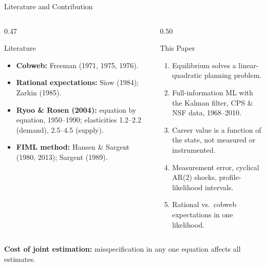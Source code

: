 \documentclass[10pt]{beamer}
\begin{document}
\begin{frame}{Literature and Contribution}
  \begin{columns}[T]
    \begin{column}{0.47\textwidth}
      \begin{block}{Literature}
        \small
        \begin{itemize}
          \item \textbf{Cobweb:} Freeman (1971, 1975, 1976).
          \item \textbf{Rational expectations:} Siow (1984); Zarkin (1985).
          \item \textbf{Ryoo \& Rosen (2004):} equation by equation, 1950--1990; elasticities 1.2--2.2 (demand), 2.5--4.5 (supply).
          \item \textbf{FIML method:} Hansen \& Sargent (1980, 2013); Sargent (1989).
        \end{itemize}
      \end{block}
    \end{column}
    \begin{column}{0.50\textwidth}
      \begin{block}{This Paper}
        \small
        \begin{enumerate}
          \item Equilibrium solves a \alert{linear-quadratic planning problem}.
          \item Full-information ML with the \alert{Kalman filter}, CPS \& NSF data, 1968--2010.
          \item Career value is a function of the state, not measured or instrumented.
          \item Measurement error, cyclical AR(2) shocks, profile-likelihood intervals.
          \item Rational vs.\ cobweb expectations in \alert{one likelihood}.
        \end{enumerate}
      \end{block}
    \end{column}
  \end{columns}
  \vspace{0.1cm}
  {\small \textbf{Cost of joint estimation:} misspecification in any one equation affects all estimates.}
\end{frame}
\end{document}
